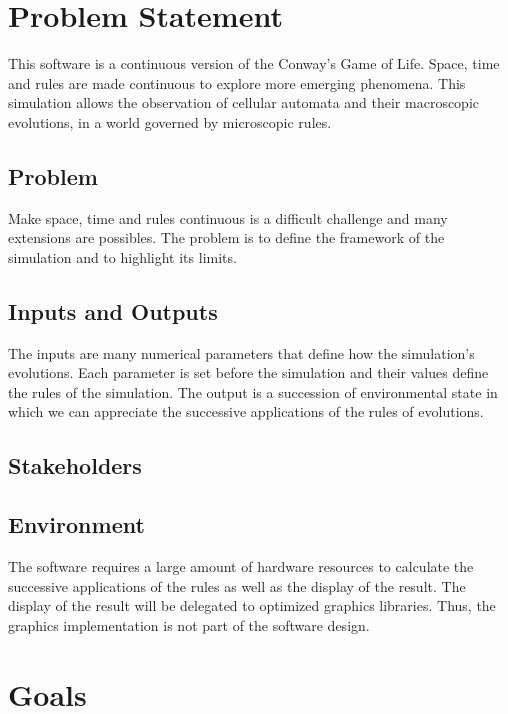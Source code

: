 \documentclass{article}
\title{\progname}
\author{\authname}
\date{01/19/2025}
\begin{document}
\maketitle

\section{Problem Statement}

This software is a continuous version of the Conway's Game of Life.
Space, time and rules are made continuous to explore more emerging phenomena.
This simulation allows the observation of cellular automata and their macroscopic evolutions, in a world governed by microscopic rules.
\subsection{Problem}

Make space, time and rules continuous is a difficult challenge and many extensions are possibles.
The problem is to define the framework of the simulation and to highlight its limits.

\subsection{Inputs and Outputs}

The inputs are many numerical parameters that define how the simulation's evolutions. Each parameter is set before the simulation and their values define the rules of the simulation.
The output is a succession of environmental state in which we can appreciate the successive applications of the rules of evolutions.

\subsection{Stakeholders}

\subsection{Environment}

The software requires a large amount of hardware resources to calculate the successive applications of the rules as well as the display of the result.
The display of the result will be delegated to optimized graphics libraries. Thus, the graphics implementation is not part of the software design. 

\section{Goals}
\end{document}
